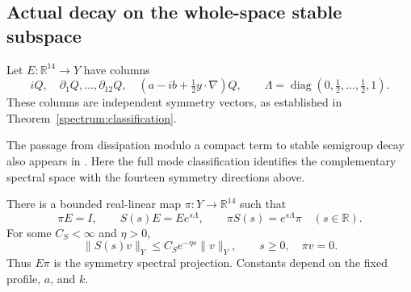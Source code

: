 \subsection{Actual decay on the whole-space stable subspace}

Let $E:\mathbb R^{14}\to Y$ have columns
\begin{equation}\label{lin:E}
 iQ,\quad \partial_1Q,\ldots,\partial_{12}Q,\quad
 (a-ib+\tfrac12y\cdot\nabla)Q,
 \qquad
 \Lambda=\operatorname{diag}(0,\tfrac12,\ldots,\tfrac12,1).
\end{equation}
These columns are independent symmetry vectors, as established in
Theorem~\ref{spectrum:classification}.

The passage from dissipation modulo a compact term to stable semigroup
decay also appears in \cite[Section~4.2]{BuckEtAl2026}. Here the full
mode classification identifies the complementary spectral space with
the fourteen symmetry directions above.

\begin{theorem}\label{linear:decay}
There is a bounded real-linear map $\pi:Y\to\mathbb R^{14}$ such that
\begin{equation}\label{lin:spectral-coordinates}
 \pi E=I,\qquad S(s)E=Ee^{s\Lambda},\qquad
 \pi S(s)=e^{s\Lambda}\pi\quad(s\in\mathbb R).
\end{equation}
For some $C_S<\infty$ and $\eta>0$,
\begin{equation}\label{lin:stable-decay}
 \|S(s)v\|_Y\le C_Se^{-\eta s}\|v\|_Y,
 \qquad s\ge0,\quad \pi v=0.
\end{equation}
Thus $E\pi$ is the symmetry spectral projection.  Constants depend on
the fixed profile, $a$, and $k$.
\end{theorem}


